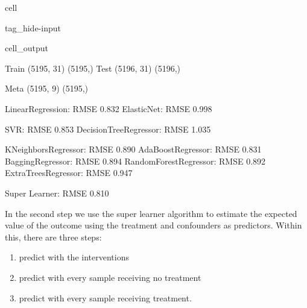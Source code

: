 \documentclass[letterpaper,10pt,english]{jupyterBook}
\begin{document}
\begin{sphinxuseclass}{cell}
\begin{sphinxuseclass}{tag_hide-input}\begin{sphinxVerbatimOutput}

\begin{sphinxuseclass}{cell_output}
\begin{sphinxVerbatim}[commandchars=\\\{\}]
Train (5195, 31) (5195,) Test (5196, 31) (5196,)
\end{sphinxVerbatim}

\begin{sphinxVerbatim}[commandchars=\\\{\}]
Meta  (5195, 9) (5195,)
\end{sphinxVerbatim}

\begin{sphinxVerbatim}[commandchars=\\\{\}]
LinearRegression: RMSE 0.832
ElasticNet: RMSE 0.998
\end{sphinxVerbatim}

\begin{sphinxVerbatim}[commandchars=\\\{\}]
SVR: RMSE 0.853
DecisionTreeRegressor: RMSE 1.035
\end{sphinxVerbatim}

\begin{sphinxVerbatim}[commandchars=\\\{\}]
KNeighborsRegressor: RMSE 0.890
AdaBoostRegressor: RMSE 0.831
BaggingRegressor: RMSE 0.894
RandomForestRegressor: RMSE 0.892
ExtraTreesRegressor: RMSE 0.947
\end{sphinxVerbatim}

\begin{sphinxVerbatim}[commandchars=\\\{\}]
Super Learner: RMSE 0.810
\end{sphinxVerbatim}

\end{sphinxuseclass}\end{sphinxVerbatimOutput}

\end{sphinxuseclass}
\end{sphinxuseclass}
\sphinxAtStartPar
In the second step we use the super learner algorithm to estimate the expected value of the outcome using the treatment and confounders as predictors. Within this, there are three steps:
\begin{enumerate}
%
\item {} 
\sphinxAtStartPar
predict with the interventions

\item {} 
\sphinxAtStartPar
predict with every sample receiving no treatment

\item {} 
\sphinxAtStartPar
predict with every sample receiving treatment.

\end{enumerate}
\end{document}
